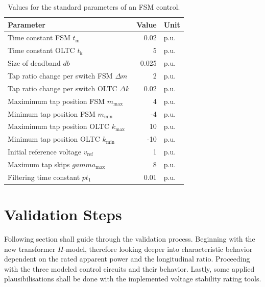 \begin{table}[htbp!]
    \caption[Values for the standard parameters of an \acs{FSM} control]{Values for the standard parameters of an \acs{FSM} control.}
    \label{tab:control-params-fsm}
    \vspace*{12pt}
    \centering
    \small
    \begin{tabularx}{\textwidth}{Xrl}
        \textbf{Parameter} & \textbf{Value} & \textbf{Unit} \\ \hline
        \toprule
        Time constant \acs{FSM}  $t_\mathrm{m}$ & 0.02 & p.u. \\
        Time constant \acs{OLTC} $t_\mathrm{k}$ & 5 & p.u. \\
        Size of deadband $db$ & 0.025 & p.u. \\
        Tap ratio change per switch \acs{FSM} $\Delta m$      & 2 & p.u. \\
        Tap ratio change per switch \acs{OLTC} $\Delta k$      & 0.02 & p.u. \\
        Maximimum tap position \acs{FSM} $m_\mathrm{max}$        & 4 & p.u. \\
        Minimum tap position \acs{FSM} $m_\mathrm{min}$        & -4 & p.u. \\
        Maximimum tap position \acs{OLTC} $k_\mathrm{max}$        & 10 & p.u. \\
        Minimum tap position \acs{OLTC} $k_\mathrm{min}$        & -10 & p.u. \\
        Initial reference voltage $v_\mathrm{ref}$        & 1 & p.u. \\
        Maximum tap skips $gamma_\mathrm{max}$    & 8 & p.u. \\
        Filtering time constant $pt_1$         & 0.01 & p.u. \\
        \bottomrule
    \end{tabularx}
\end{table}

\section{Validation Steps}

Following section shall guide through the validation process.
Beginning with the new transformer $\Pi$-model, therefore looking deeper into characteristic behavior dependent on the rated apparent power and the longitudinal ratio.
Proceeding with the three modeled control circuits and their behavior.
Lastly, some applied plausibilisations shall be done with the implemented voltage stability rating tools.

